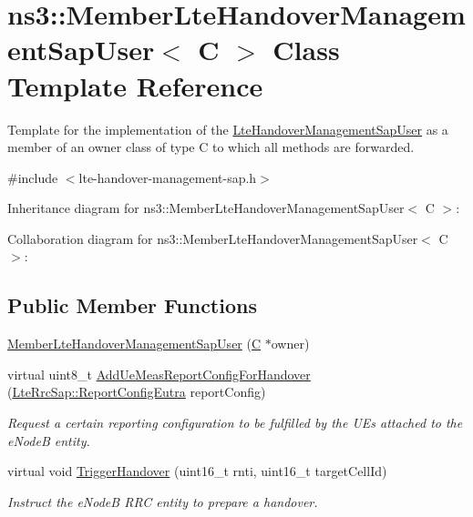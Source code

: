 \hypertarget{classns3_1_1MemberLteHandoverManagementSapUser}{}\section{ns3\+:\+:Member\+Lte\+Handover\+Management\+Sap\+User$<$ C $>$ Class Template Reference}
\label{classns3_1_1MemberLteHandoverManagementSapUser}


Template for the implementation of the \hyperlink{classns3_1_1LteHandoverManagementSapUser}{Lte\+Handover\+Management\+Sap\+User} as a member of an owner class of type C to which all methods are forwarded.  




{\ttfamily \#include $<$lte-\/handover-\/management-\/sap.\+h$>$}



Inheritance diagram for ns3\+:\+:Member\+Lte\+Handover\+Management\+Sap\+User$<$ C $>$\+:


Collaboration diagram for ns3\+:\+:Member\+Lte\+Handover\+Management\+Sap\+User$<$ C $>$\+:
\subsection*{Public Member Functions}
\begin{DoxyCompactItemize}
\item 
\hyperlink{classns3_1_1MemberLteHandoverManagementSapUser_afa64277c537cbb4407f7bf47b7b17e7f}{Member\+Lte\+Handover\+Management\+Sap\+User} (\hyperlink{loss__COST231__small__cities__urban_8m_aaa53ca0b650dfd85c4f59fa156f7a2cc}{C} $\ast$owner)
\item 
virtual uint8\+\_\+t \hyperlink{classns3_1_1MemberLteHandoverManagementSapUser_aeccf2f3c3f2901cbb3f9c5af42ad40eb}{Add\+Ue\+Meas\+Report\+Config\+For\+Handover} (\hyperlink{structns3_1_1LteRrcSap_1_1ReportConfigEutra}{Lte\+Rrc\+Sap\+::\+Report\+Config\+Eutra} report\+Config)
\begin{DoxyCompactList}\small\item\em Request a certain reporting configuration to be fulfilled by the U\+Es attached to the e\+NodeB entity. \end{DoxyCompactList}\item 
virtual void \hyperlink{classns3_1_1MemberLteHandoverManagementSapUser_a54948f22e6eabf1f3c2623dfbd5236fa}{Trigger\+Handover} (uint16\+\_\+t rnti, uint16\+\_\+t target\+Cell\+Id)
\begin{DoxyCompactList}\small\item\em Instruct the e\+NodeB R\+RC entity to prepare a handover. \end{DoxyCompactList}\end{DoxyCompactItemize}
